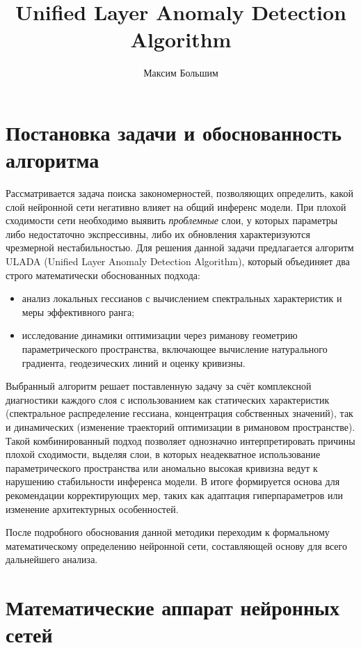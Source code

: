 \documentclass[a4paper,12pt]{article}
\title{\textbf{Unified Layer Anomaly Detection Algorithm}}
\author{Максим Большим}
\date{}
\begin{document}
\maketitle

\section{Постановка задачи и обоснованность алгоритма}

Рассматривается задача поиска закономерностей, позволяющих определить, какой слой нейронной сети негативно влияет на общий инференс модели. При плохой сходимости сети необходимо выявить \emph{проблемные} слои, у которых параметры либо недостаточно экспрессивны, либо их обновления характеризуются чрезмерной нестабильностью. Для решения данной задачи предлагается алгоритм ULADA (Unified Layer Anomaly Detection Algorithm), который объединяет два строго математически обоснованных подхода:
\begin{itemize}[leftmargin=1.0cm]
\item анализ локальных гессианов с вычислением спектральных характеристик и меры эффективного ранга;
\item исследование динамики оптимизации через риманову геометрию параметрического пространства, включающее вычисление натурального градиента, геодезических линий и оценку кривизны.
\end{itemize}

Выбранный алгоритм решает поставленную задачу за счёт комплексной диагностики каждого слоя с использованием как статических характеристик (спектральное распределение гессиана, концентрация собственных значений), так и динамических (изменение траекторий оптимизации в римановом пространстве). Такой комбинированный подход позволяет однозначно интерпретировать причины плохой сходимости, выделяя слои, в которых неадекватное использование параметрического пространства или аномально высокая кривизна ведут к нарушению стабильности инференса модели. В итоге формируется основа для рекомендации корректирующих мер, таких как адаптация гиперпараметров или изменение архитектурных особенностей.

После подробного обоснования данной методики переходим к формальному математическому определению нейронной сети, составляющей основу для всего дальнейшего анализа.

\section{Математические аппарат нейронных сетей}
\end{document}

